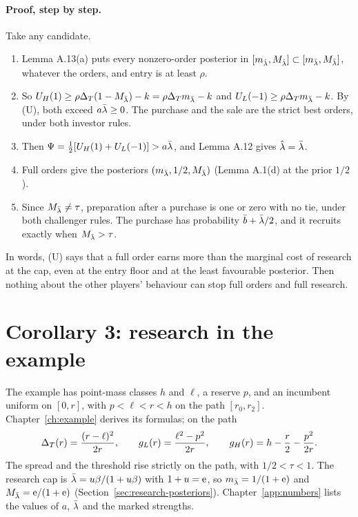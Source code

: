 \paragraph{Proof, step by step.} Take any candidate.
\begin{enumerate}
\item Lemma A.13(a) puts every nonzero-order posterior in \([m_{\hat\lambda},M_{\hat\lambda}]\subset[m_{\bar\lambda},M_{\bar\lambda}]\),
whatever the orders, and entry is at least \(\rho\).
\item So \(U_H(1)\ge\rho\Delta_T(1-M_{\bar\lambda})-k=\rho\Delta_T m_{\bar\lambda}-k\) and \(U_L(-1)\ge\rho\Delta_T m_{\bar\lambda}-k\). By (U), both exceed
\(a\bar\lambda\ge0\). The purchase and the sale are the strict best orders, under both investor rules.
\item Then \(\Psi=\tfrac12[U_H(1)+U_L(-1)]>a\bar\lambda\), and Lemma A.12 gives \(\hat\lambda=\bar\lambda\).
\item Full orders give the posteriors \((m_{\bar\lambda},1/2,M_{\bar\lambda})\) (Lemma A.1(d) at the prior \(1/2\)).
\item Since \(M_{\bar\lambda}\ne\tau\), preparation after a purchase is one or zero with no tie, under both challenger rules.
The purchase has probability \(\bar b+\bar\lambda/2\), and it recruits exactly when \(M_{\bar\lambda}>\tau\).
\end{enumerate}
In words, (U) says that a full order earns more than the marginal cost of research at the cap, even at the entry
floor and at the least favourable posterior. Then nothing about the other players' behaviour can stop full orders and
full research.

\section{Corollary 3: research in the example}\label{sec:research-example}

The example has point-mass classes \(h\) and \(\ell\), a reserve \(p\), and an incumbent uniform on \([0,r]\), with
\(p<\ell<r<h\) on the path \([r_0,r_2]\). Chapter~\ref{ch:example} derives its formulas; on the path
\[
\Delta_T(r)=\frac{(r-\ell)^2}{2r},\qquad g_L(r)=\frac{\ell^2-p^2}{2r},\qquad g_H(r)=h-\frac r2-\frac{p^2}{2r}.
\]
The spread and the threshold rise strictly on the path, with \(1/2<\tau<1\). The research cap is
\(\bar\lambda=u\beta/(1+u\beta)\) with \(1+u=\mathrm{e}\), so \(m_{\bar\lambda}=1/(1+\mathrm{e})\) and \(M_{\bar\lambda}=\mathrm{e}/(1+\mathrm{e})\)
(Section~\ref{sec:research-posteriors}). Chapter~\ref{app:numbers} lists the values of \(a\), \(\bar\lambda\) and the marked
strengths.


